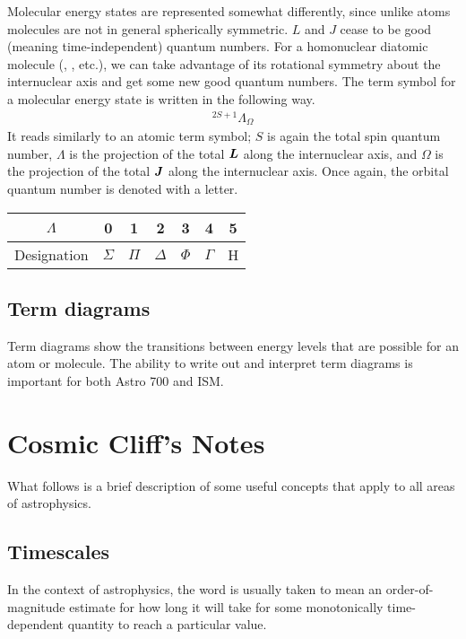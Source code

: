 Molecular energy states are represented somewhat differently, since unlike atoms molecules are not in general spherically symmetric. $L$ and $J$ cease to be good (meaning time-independent) quantum numbers. For a homonuclear diatomic molecule (, , etc.), we can take advantage of its rotational symmetry about the internuclear axis and get some new good quantum numbers. The term symbol for a molecular energy state is written in the following way.
\begin{align}
    ^{2S+1}\Lambda_\Omega%
\end{align}
It reads similarly to an atomic term symbol; $S$ is again the total spin quantum number, $\Lambda$ is the projection of the total $\vb*{L}$ along the internuclear axis, and $\Omega$ is the projection of the total $\vb*{J}$ along the internuclear axis.
Once again, the orbital quantum number is denoted with a letter.
\begin{center}
    \begin{tabular}{|c|cccccc|}
        \hline
        $\Lambda$ & 0 & 1 & 2 & 3 & 4 & 5 \\
        \hline
        Designation & $\Sigma$ & $\Pi$ & $\Delta$ & $\Phi$ & $\Gamma$ & H \\
        \hline
    \end{tabular}
\end{center}

\subsection{Term diagrams}
Term diagrams show the transitions between energy levels that are possible for an atom or molecule. The ability to write out and interpret term diagrams is important for both Astro 700 and ISM.


\section{Cosmic Cliff's Notes}
What follows is a brief description of some useful concepts that apply to all areas of astrophysics.

\subsection{Timescales}
In the context of astrophysics, the word  is usually taken to mean an order-of-magnitude estimate for how long it will take for some monotonically time-dependent quantity to reach a particular value.

